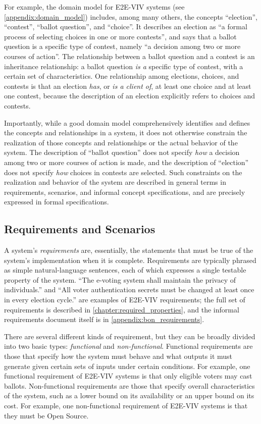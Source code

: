 For example, the domain model for E2E-VIV systems (see
\autoref{appendix:domain_model}) includes, among many others, the
concepts ``election'', ``contest'', ``ballot question'', and
``choice''. It describes an election as ``a formal process of
selecting choices in one or more contests'', and says that a ballot
question is a specific type of contest, namely ``a decision among two
or more courses of action''. The relationship between a ballot
question and a contest is an inheritance relationship: a ballot
question \emph{is a} specific type of contest, with a certain set of
characteristics. One relationship among elections, choices, and
contests is that an election \emph{has}, or \emph{is a client of}, at
least one choice and at least one contest, because the description of
an election explicitly refers to choices and contests.

Importantly, while a good domain model comprehensively identifies and
defines the concepts and relationships in a system, it does not
otherwise constrain the realization of those concepts and
relationships or the actual behavior of the system. The description of
``ballot question'' does not specify \emph{how} a decision among two
or more courses of action is made, and the description of ``election''
does not specify \emph{how} choices in contests are selected. Such
constraints on the realization and behavior of the system are
described in general terms in requirements, scenarios, and informal
concept specifications, and are precisely expressed in formal
specifications.

\subsection{Requirements and Scenarios}

A system's \emph{requirements} are, essentially, the statements that
must be true of the system's implementation when it is
complete. Requirements are typically phrased as simple
natural-language sentences, each of which expresses a single testable
property of the system. ``The e-voting system shall maintain the
privacy of individuals.'' and ``All voter authentication secrets must
be changed at least once in every election cycle.'' are examples of
E2E-VIV requirements; the full set of requirements is described in
\autoref{chapter:required_properties}, and the informal requirements
document itself is in \autoref{appendix:bon_requirements}.

There are several different kinds of requirement, but they can be
broadly divided into two basic types: \emph{functional} and
\emph{non-functional}. Functional requirements are those that specify
how the system must behave and what outputs it must generate given
certain sets of inputs under certain conditions. For example, one
functional requirement of E2E-VIV systems is that only eligible voters
may cast ballots. Non-functional requirements are those that specify
overall characteristics of the system, such as a lower bound on its
availability or an upper bound on its cost. For example, one
non-functional requirement of E2E-VIV systems is that they must be
Open Source.


